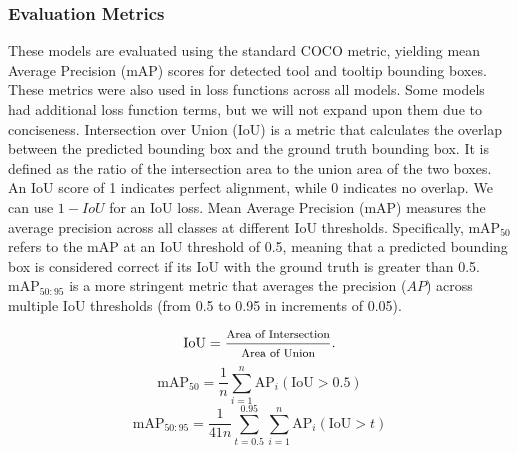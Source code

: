 \subsubsection{Evaluation Metrics}

These models are evaluated using the standard COCO metric, yielding mean Average Precision (mAP) scores for detected tool and tooltip bounding boxes. These metrics were also used in loss functions across all models. Some models had additional loss function terms, but we will not expand upon them due to conciseness. Intersection over Union (IoU) is a metric that calculates the overlap between the predicted bounding box and the ground truth bounding box. It is defined as the ratio of the intersection area to the union area of the two boxes. An IoU score of 1 indicates perfect alignment, while 0 indicates no overlap. We can use $1 - IoU$ for an IoU loss. Mean Average Precision (mAP) measures the average precision across all classes at different IoU thresholds. Specifically, mAP$_{50}$ refers to the mAP at an IoU threshold of 0.5, meaning that a predicted bounding box is considered correct if its IoU with the ground truth is greater than 0.5. mAP$_{50:95}$ is a more stringent metric that averages the precision ($AP$) across multiple IoU thresholds (from 0.5 to 0.95 in increments of 0.05). 

\begin{small}
\begin{equation}
    \text{IoU} = \frac{\text{\footnotesize{Area of Intersection}}}{\text{\footnotesize{Area of Union}}}.
\end{equation}
\begin{equation}
    \text{mAP}_{50} = \frac{1}{n} \sum_{i=1}^{n} \text{AP}_{i}(\text{IoU} > 0.5)
\end{equation}
\begin{equation}
    \text{mAP}_{50:95} = \frac{1}{41n} \sum_{t=0.5}^{0.95} \sum_{i=1}^{n} \text{AP}_{i}(\text{IoU} > t)
\end{equation}
\end{small}
